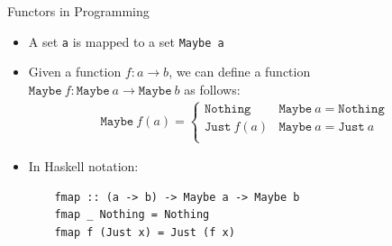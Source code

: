 \documentclass[aspectratio=169]{beamer} %
\begin{document}
{\begin{frame}[fragile]{Functors in Programming}
\begin{itemize}
  \item A set \texttt{a} is mapped to a set \texttt{Maybe a}
  \item Given a function $f : a \to b$, we can define a function $\texttt{Maybe}\ f : \texttt{Maybe}\ a \to \texttt{Maybe}\ b$  as follows:
  \begin{align*}
   \texttt{Maybe}\ f(a) = \begin{cases}
                           \texttt{Nothing} & \texttt{Maybe}\ a  = \texttt{Nothing}\\
                           \texttt{Just}\ f(a) & \texttt{Maybe}\ a  = \texttt{Just}\ a\\
                          \end{cases}
  \end{align*}
  \item In Haskell notation:
  \begin{verbatim}
    fmap :: (a -> b) -> Maybe a -> Maybe b
    fmap _ Nothing = Nothing
    fmap f (Just x) = Just (f x)
  \end{verbatim}


\end{itemize}
\end{frame}}
\end{document}

